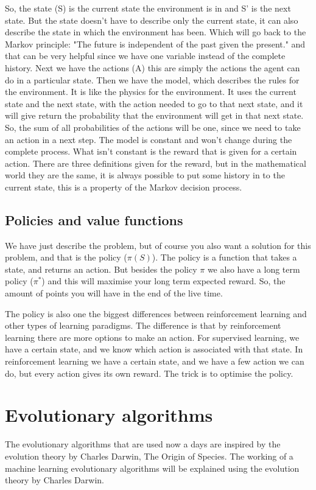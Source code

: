 \documentclass{report}
\begin{document}
So, the state (S) is the current state the environment is in and S' is the next state. But the state doesn't have to describe only the current state, it can also describe the state in which the environment has been. Which will go back to the Markov principle: "The future is independent of the past given the present." and that can be very helpful since we have one variable instead of the complete history. Next we have the actions (A) this are simply the actions the agent can do in a particular state. Then we have the model, which describes the rules for the environment. It is like the physics for the environment. It uses the current state and the next state, with the action needed to go to that next state, and it will give return the probability that the environment will get in that next state. So, the sum of all probabilities of the actions will be one, since we need to take an action in a next step. The model is constant and won't change during the complete process. What isn't constant is the reward that is given for a certain action. There are three definitions given for the reward, but in the mathematical world they are the same, it is always possible to put some history in to the current state, this is a property of the Markov decision process.

\subsection{Policies and value functions}
We have just describe the problem, but of course you also want a solution for this problem, and that is the policy ($\pi(S)$). The policy is a function that takes a state, and returns an action. But besides the policy $\pi$ we also have a long term policy ($\pi^*$) and this will maximise your long term expected reward. So, the amount of points you will have in the end of the live time.

The policy is also one the biggest differences between reinforcement learning and other types of learning paradigms. The difference is that by reinforcement learning there are more options to make an action. For supervised learning, we have a certain state, and we know which action is associated with that state. In reinforcement learning we have a certain state, and we have a few action we can do, but every action gives its own reward. The trick is to optimise the policy.

\section{Evolutionary algorithms}
The evolutionary algorithms that are used now a days are inspired by the evolution theory by Charles Darwin\cite{RL_EA}, The Origin of Species. The working of a machine learning evolutionary algorithms will be explained using the evolution theory by Charles Darwin.
\end{document}
